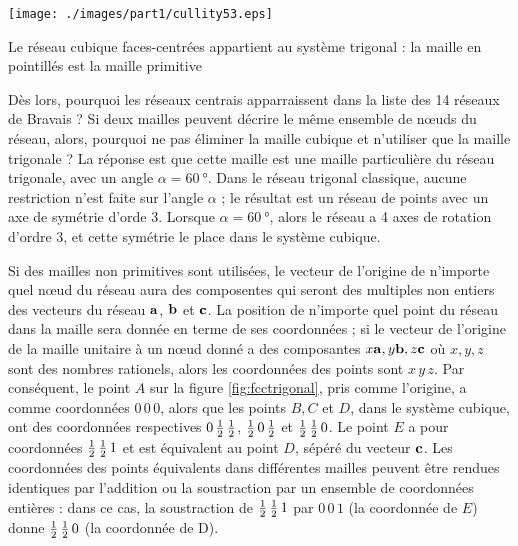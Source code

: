 \begin{marginfigure}
    \texttt{[image: ./images/part1/cullity53.eps]}
    \caption{Le réseau cubique faces-centrées appartient au système trigonal : la
    maille en pointillés est la maille primitive}
    \label{fig:fcctrigonal}
\end{marginfigure}

Dès lors, pourquoi les réseaux centrais apparraissent dans la liste des 14
réseaux de Bravais ? Si deux mailles peuvent décrire le même ensemble de nœuds du
réseau, alors, pourquoi ne pas éliminer la maille cubique et n'utiliser que la
maille trigonale ? La réponse est que cette maille est une maille particulière du
réseau trigonale, avec un angle $\alpha = \SI{60}{\degree}$. Dans le réseau
trigonal classique, aucune restriction n'est faite sur l'angle $\alpha$ ; le
résultat est un réseau de points avec un axe de symétrie d'orde 3. Lorsque
$\alpha = \SI{60}{\degree}$, alors le réseau a 4 axes de rotation d'ordre 3, et
cette symétrie le place dans le système cubique.

Si des mailles non primitives sont utilisées, le vecteur de l'origine de
n'importe quel nœud du réseau aura des composentes qui seront des multiples non
entiers des  vecteurs du réseau $\mathbf{a}$, $\mathbf{b}$ et $\mathbf{c}$. La
position de n'importe quel point du réseau dans la maille sera donnée en terme de
ses coordonnées ; si le vecteur de l'origine de la maille unitaire à un nœud
donné a des composantes $x\mathbf{a}, y\mathbf{b}, z\mathbf{c}$ où $x,y,z$ sont
des nombres rationels, alors les coordonnées des points sont $x\,y\,z$. Par
conséquent, le point $A$ sur la figure \ref{fig:fcctrigonal}, pris comme
l'origine, a comme coordonnées $0\,0\,0$, alors que les points $B, C$ et $D$,
dans le système cubique, ont des coordonnées respectives $0\,\mbox{$\frac{1}{2}$}\,\mbox{$\frac{1}{2}$}$,
$\mbox{$\frac{1}{2}$}\,0\,\mbox{$\frac{1}{2}$}$ et $\mbox{$\frac{1}{2}$}\,\mbox{$\frac{1}{2}$}\,0$. Le point $E$ a pour coordonnées
$\mbox{$\frac{1}{2}$}\,\mbox{$\frac{1}{2}$}\,1$ et est équivalent au point $D$, sépéré du vecteur $\mathbf{c}$.
Les coordonnées des points équivalents dans différentes mailles peuvent être
rendues identiques par l'addition ou la soustraction par un ensemble de
coordonnées entières : dans ce cas, la soustraction de $\mbox{$\frac{1}{2}$}\,\mbox{$\frac{1}{2}$}\,1$ par
$0\,0\,1$ (la coordonnée de $E$) donne $\mbox{$\frac{1}{2}$}\,\mbox{$\frac{1}{2}$}\,0$ (la coordonnée de D).

